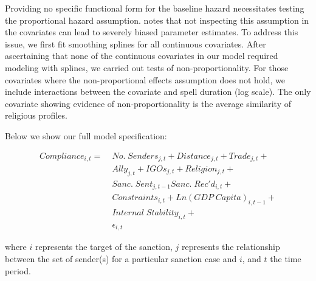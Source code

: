 Providing no specific functional form for the baseline hazard necessitates testing the proportional hazard assumption. \citet{keele2010proportionally} notes that not inspecting this assumption in the covariates can lead to severely biased parameter estimates. To address this issue, we first fit smoothing splines for all continuous covariates. After ascertaining that none of the continuous covariates in our model required modeling with splines, we carried out tests of non-proportionality. For those covariates where the non-proportional effects assumption does not hold, we include interactions between the covariate and spell duration (log scale). The only covariate showing evidence of non-proportionality is the average similarity of religious profiles.

Below we show our full model specification: 

\begin{align*}
		Compliance_{i,t} =\; & No. \; Senders_{j,t} + Distance_{j,t} + Trade_{j,t}  + \\
		 &Ally_{j,t} + IGOs_{j,t} + Religion_{j,t} +\\
 		 &Sanc. \; Sent_{j,t-1} Sanc. \; Rec'd_{i,t} + \\
		 &Constraints_{i,t} + Ln(GDP \; Capita)_{i,t-1} +\\
		 & Internal \; Stability_{i,t} +\\
		 &\epsilon_{i,t}
	\end{align*}

where $i$ represents the target of the sanction, $j$ represents the relationship between the set of sender(s) for a particular sanction case and $i$, and $t$ the time period.